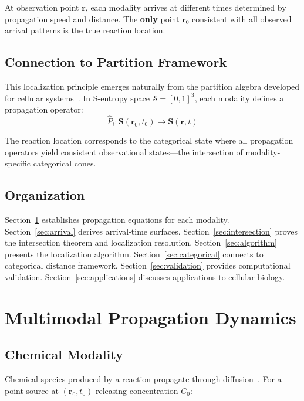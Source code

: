 \documentclass[11pt,a4paper]{article}
\theoremstyle{remark}
\newcommand{\Sspace}{\mathcal{S}}
\newcommand{\Scoord}{\mathbf{S}}
\newcommand{\rxnpos}{\mathbf{r}_0}
\newcommand{\rxntime}{t_0}
\newcommand{\obspos}{\mathbf{r}}
\begin{document}
At observation point $\obspos$, each modality arrives at different times determined by propagation speed and distance. The \textbf{only} point $\rxnpos$ consistent with all observed arrival patterns is the true reaction location.

\subsection{Connection to Partition Framework}

This localization principle emerges naturally from the partition algebra developed for cellular systems~\citep{Sachikonye2025_Observation,Sachikonye2025_PartitionEquations}. In S-entropy space $\Sspace = [0,1]^3$, each modality defines a propagation operator:
\begin{equation}
    \hat{P}_i: \Scoord(\rxnpos, \rxntime) \to \Scoord(\obspos, t)
\end{equation}

The reaction location corresponds to the categorical state where all propagation operators yield consistent observational states---the intersection of modality-specific categorical cones.

\subsection{Organization}

Section~\ref{sec:propagation} establishes propagation equations for each modality. Section~\ref{sec:arrival} derives arrival-time surfaces. Section~\ref{sec:intersection} proves the intersection theorem and localization resolution. Section~\ref{sec:algorithm} presents the localization algorithm. Section~\ref{sec:categorical} connects to categorical distance framework. Section~\ref{sec:validation} provides computational validation. Section~\ref{sec:applications} discusses applications to cellular biology.

\section{Multimodal Propagation Dynamics}
\label{sec:propagation}

\subsection{Chemical Modality}

Chemical species produced by a reaction propagate through diffusion~\citep{crank1979mathematics,berg1993random}. For a point source at $(\rxnpos, \rxntime)$ releasing concentration $C_0$:
\end{document}
